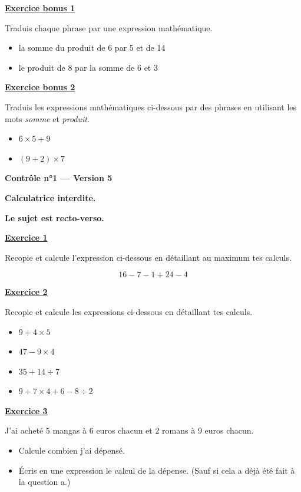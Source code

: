 \documentclass[13pt]{extarticle}
\newcommand{\exo}[1]{%
  \vspace{0.8em}%
  \noindent\large\underline{\textbf{Exercice #1}}%
  \vspace{0.2em}\par%
}
\newcommand{\exobonus}[1]{%
  \vspace{0.8em}%
  \noindent\large\underline{\textbf{Exercice bonus #1}}%
  \vspace{0.2em}\par%
}
\newcommand{\entetecontrole}[1]{%
\begin{center}
\textbf{\huge{Contrôle n°1 --- Version #1}}
\end{center}

\begin{center}
\textbf{Calculatrice interdite.}\par
\textbf{Le sujet est recto-verso.}

\end{center}
}
\begin{document}
\exobonus{1}

\noindent Traduis chaque phrase par une expression mathématique.

\begin{itemize}
  \item[a)] la somme du produit de 6 par 5 et de 14
  \item[b)] le produit de 8 par la somme de 6 et 3
\end{itemize}

\exobonus{2}

\noindent Traduis les expressions mathématiques ci-dessous par des phrases en utilisant les mots \emph{somme} et \emph{produit}.

\begin{itemize}
  \item[a)] $6 \times 5 + 9$
  \item[b)] $(9 + 2) \times 7$
\end{itemize}

\newpage

\entetecontrole{5}
\exo{1}

\noindent Recopie et calcule l'expression ci-dessous en détaillant au maximum tes calculs.

\[
16 - 7 - 1 + 24 - 4
\]

\exo{2}

\noindent Recopie et calcule les expressions ci-dessous en détaillant tes calculs.

\begin{itemize}
  \item[a)] $9 + 4 \times 5$
  \item[b)] $47 - 9 \times 4$
  \item[c)] $35 + 14 \div 7$
  \item[d)] $9 + 7 \times 4 + 6 - 8 \div 2$
\end{itemize}

\exo{3}

\noindent J'ai acheté 5 mangas à 6 euros chacun et 2 romans à 9 euros chacun.

\begin{itemize}
  \item[a)] Calcule combien j'ai dépensé.
  \item[b)] Écris en une expression le calcul de la dépense. (Sauf si cela a déjà été fait à la question a.)
\end{itemize}
\end{document}
